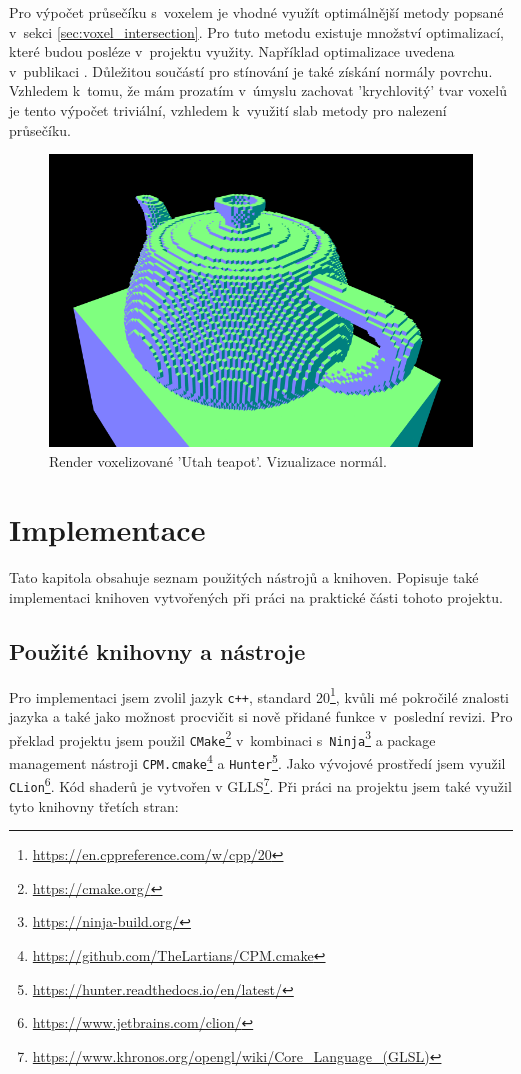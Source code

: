 Pro výpočet průsečíku s~voxelem je vhodné využít optimálnější metody popsané v~sekci \ref{sec:voxel_intersection}. Pro tuto metodu existuje množství optimalizací, které budou posléze v~projektu využity. Například optimalizace uvedena v~publikaci \cite{Majercik2018Voxel}. Důležitou součástí pro stínování je také získání normály povrchu. Vzhledem k~tomu, že mám prozatím v~úmyslu zachovat 'krychlovitý' tvar voxelů je tento výpočet triviální, vzhledem k~využití slab metody pro nalezení průsečíku.

\begin{figure}[H]
	\centering
	\includegraphics[scale=1]{obrazky-figures/normals_teapot.png}
	\caption{Render voxelizované 'Utah teapot'. Vizualizace normál. }
	\label{fig:octree_child}
\end{figure}




\chapter{Implementace}
\label{implementace}

Tato kapitola obsahuje seznam použitých nástrojů a knihoven. Popisuje také implementaci knihoven vytvořených při práci na praktické části tohoto projektu.

\section{Použité knihovny a nástroje}
Pro implementaci jsem zvolil jazyk \texttt{c++}, standard 20\footnote{\url{https://en.cppreference.com/w/cpp/20}}, kvůli mé pokročilé znalosti jazyka a také jako možnost procvičit si nově přidané funkce v~poslední revizi. Pro překlad projektu jsem použil \texttt{CMake}\footnote{\url{https://cmake.org/}} v~kombinaci s~\texttt{Ninja}\footnote{\url{https://ninja-build.org/}} a package management nástroji \texttt{CPM.cmake}\footnote{\url{https://github.com/TheLartians/CPM.cmake}} a \texttt{Hunter}\footnote{\url{https://hunter.readthedocs.io/en/latest/}}. Jako vývojové prostředí jsem využil \texttt{CLion}\footnote{\url{https://www.jetbrains.com/clion/}}. Kód shaderů je vytvořen v GLLS\footnote{\url{https://www.khronos.org/opengl/wiki/Core_Language_(GLSL)}}. Při práci na projektu jsem také využil tyto knihovny třetích stran:

